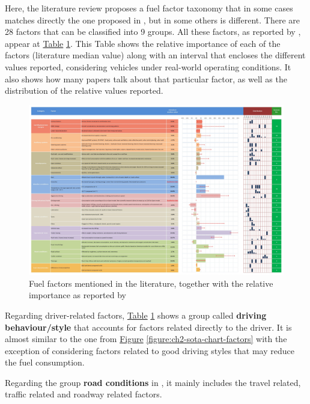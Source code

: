 Here, the literature review proposes a fuel factor taxonomy that in some cases matches directly the one proposed in \parencite{zhou2016review}, but in some others is different. There are 28 factors that can be classified into 9 groups. All these factors, as reported by \parencite{zacharof2016review}, appear at \hyperref[table:ch2-sota-factors-table]{Table} \ref{table:ch2-sota-factors-table}. This Table shows the relative importance of each of the factors (literature median value) along with an interval that encloses the different values reported, considering vehicles under real-world operating conditions. It also shows how many papers talk about that particular factor, as well as the distribution of the relative values reported. 

\begin{figure}
  \centering
  \includegraphics[width=0.95\columnwidth]{figures/factors_table.jpg}
  \caption{Fuel factors mentioned in the literature, together with the relative importance as reported by \parencite{zacharof2016review}}
  \label{table:ch2-sota-factors-table}
\end{figure}

Regarding driver-related factors, \hyperref[table:ch2-sota-factors-table]{Table} \ref{table:ch2-sota-factors-table} shows a group called \textbf{driving behaviour/style} that accounts for factors related directly to the driver. It is almost similar to the one from \hyperref[figure:ch2-sota-chart-factors]{Figure} \ref{figure:ch2-sota-chart-factors} with the exception of considering factors related to good driving styles that may reduce the fuel consumption.

Regarding the group \textbf{road conditions} in \parencite{zhou2016review}, it mainly includes the travel related, traffic related and roadway related factors.

